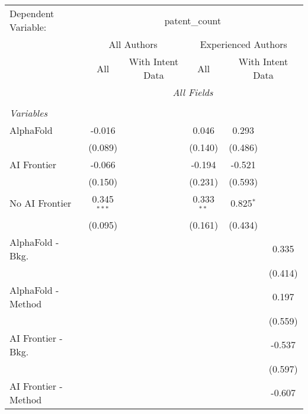 \begingroup
\centering
\begin{tabular}{lcccccc}
   \tabularnewline \midrule \midrule
   Dependent Variable: & \multicolumn{6}{c}{patent\_count}\\
 & \multicolumn{3}{c}{All Authors} & \multicolumn{3}{c}{Experienced Authors} \\
\cmidrule(lr){2-4} \cmidrule(lr){5-7}
 & \multicolumn{1}{c}{All} & \multicolumn{2}{c}{With Intent Data} & \multicolumn{1}{c}{All} & \multicolumn{2}{c}{With Intent Data} \\
\cmidrule(lr){2-2} \cmidrule(lr){3-4} \cmidrule(lr){5-5} \cmidrule(lr){6-7}
 & \multicolumn{6}{c}{\textit{All Fields}} \\ \\
   \emph{Variables}\\
   AlphaFold               & -0.016        &         &         & 0.046        & 0.293       &   \\   
                           & (0.089)       &         &         & (0.140)      & (0.486)     &   \\   
   AI Frontier             & -0.066        &         &         & -0.194       & -0.521      &   \\   
                           & (0.150)       &         &         & (0.231)      & (0.593)     &   \\   
   No AI Frontier          & 0.345$^{***}$ &         &         & 0.333$^{**}$ & 0.825$^{*}$ &   \\   
                           & (0.095)       &         &         & (0.161)      & (0.434)     &   \\   
   AlphaFold - Bkg.        &               &         &         &              &             & 0.335\\   
                           &               &         &         &              &             & (0.414)\\   
   AlphaFold - Method      &               &         &         &              &             & 0.197\\   
                           &               &         &         &              &             & (0.559)\\   
   AI Frontier - Bkg.      &               &         &         &              &             & -0.537\\   
                           &               &         &         &              &             & (0.597)\\   
   AI Frontier - Method    &               &         &         &              &             & -0.607\\   

\end{tabular}
